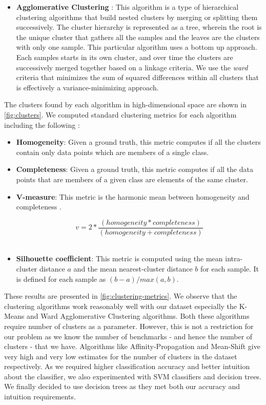 \begin{itemize}
\item \textbf{Agglomerative Clustering} :
This algorithm is a type of hierarchical clustering algorithms that build nested clusters
by merging or splitting them successively.
The cluster hierarchy is represented as a tree, wherein the root is the unique
cluster that gathers all the samples and the leaves are the clusters with only
one sample.
This particular algorithm uses a bottom up approach. Each samples starts in
its own cluster, and over time the clusters are successively merged together
based on a linkage criteria.
We use the \textit{ward} criteria that minimizes the sum of squared differences
within all clusters that is effectively a variance-minimizing approach.
\end{itemize}

The clusters found by each algorithm in high-dimensional space are shown in
\cref{fig:clusters}.
We computed standard clustering metrics for each algorithm including the
following :\\

\begin{itemize}
  \item \textbf{Homogeneity}:
	Given a ground truth, this metric computes if all the clusters contain only
	data points which are members of a single class.\\

  \item \textbf{Completeness}:
	Given a ground truth, this metric computes if all the data points that are
	members of a given class are elements of the same cluster.\\

  \item \textbf{V-measure}:
	This metric is the harmonic mean between homogeneity and completeness
	\citep{v-measure}.

	$$v = 2 * \frac{(homogeneity * completeness)}{(homogeneity + completeness)}$$\\

  \item \textbf{Silhouette coefficient}:
  This metric is computed using the mean intra-cluster distance
  $a$ and the mean nearest-cluster distance $b$ for each sample.
  It is defined for each sample as $(b-a)/max(a, b)$.\\
\end{itemize}

These results are presented in \cref{fig:clustering-metrics}. We observe that
the clustering algorithms work reasonably well with our dataset
especially the K-Means and Ward Agglomerative Clustering algorithms.
Both these algorithms require number of clusters as a parameter.
However, this is not a restriction for our problem as we know the number of
benchmarks - and hence the number of clusters - that we have.
Algorithms like Affinity-Propagation and Mean-Shift give very high and
very low estimates for the number of clusters in the dataset respectively.
As we required higher classification accuracy and better intuition about
the classifier, we also experimented with SVM classifiers and decision trees.
We finally decided to use decision trees as they met both our accuracy
and intuition requirements.

